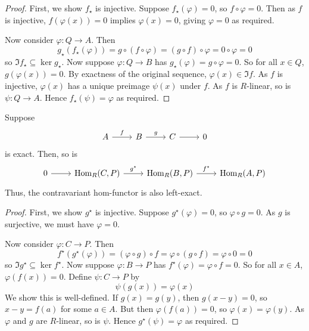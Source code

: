 \begin{proof}
    First, we show \( f_\star \) is injective.
    Suppose \( f_\star(\varphi) = 0 \), so \( f \circ \varphi = 0 \).
    Then as \( f \) is injective, \( f(\varphi(x)) = 0 \) implies \( \varphi(x) = 0 \), giving \( \varphi = 0 \) as required.

    Now consider \( \varphi : Q \to A \).
    Then
    \[ g_\star (f_\star(\varphi)) = g \circ (f \circ \varphi) = (g \circ f) \circ \varphi = 0 \circ \varphi = 0 \]
    so \( \Im f_\star \subseteq \ker g_\star \).
    Now suppose \( \varphi : Q \to B \) has \( g_\star(\varphi) = g \circ \varphi = 0 \).
    So for all \( x \in Q \), \( g(\varphi(x)) = 0 \).
    By exactness of the original sequence, \( \varphi(x) \in \Im f \).
    As \( f \) is injective, \( \varphi(x) \) has a unique preimage \( \psi(x) \) under \( f \).
    As \( f \) is \( R \)-linear, so is \( \psi : Q \to A \).
    Hence \( f_\star(\psi) = \varphi \) as required.
\end{proof}
\begin{proposition}
    Suppose
    \[\begin{tikzcd}
        A & B & C & 0
        \arrow["f", from=1-1, to=1-2]
        \arrow["g", from=1-2, to=1-3]
        \arrow[from=1-3, to=1-4]
    \end{tikzcd}\]
    is exact.
    Then, so is
    \[\begin{tikzcd}
        0 & {\Hom_R(C, P)} & {\Hom_R(B, P)} & {\Hom_R(A, P)}
        \arrow[from=1-1, to=1-2]
        \arrow["{g^\star}", from=1-2, to=1-3]
        \arrow["{f^\star}", from=1-3, to=1-4]
    \end{tikzcd}\]
    Thus, the contravariant hom-functor is also left-exact.
\end{proposition}
\begin{proof}
    First, we show \( g^\star \) is injective.
    Suppose \( g^\star(\varphi) = 0 \), so \( \varphi \circ g = 0 \).
    As \( g \) is surjective, we must have \( \varphi = 0 \).

    Now consider \( \varphi : C \to P \).
    Then
    \[ f^\star(g^\star(\varphi)) = (\varphi \circ g) \circ f = \varphi \circ (g \circ f) = \varphi \circ 0 = 0 \]
    so \( \Im g^\star \subseteq \ker f^\star \).
    Now suppose \( \varphi : B \to P \) has \( f^\star(\varphi) = \varphi \circ f = 0 \).
    So for all \( x \in A \), \( \varphi(f(x)) = 0 \).
    Define \( \psi : C \to P \) by
    \[ \psi(g(x)) = \varphi(x) \]
    We show this is well-defined.
    If \( g(x) = g(y) \), then \( g(x - y) = 0 \), so \( x - y = f(a) \) for some \( a \in A \).
    But then \( \varphi(f(a)) = 0 \), so \( \varphi(x) = \varphi(y) \).
    As \( \varphi \) and \( g \) are \( R \)-linear, so is \( \psi \).
    Hence \( g^\star(\psi) = \varphi \) as required.
\end{proof}
